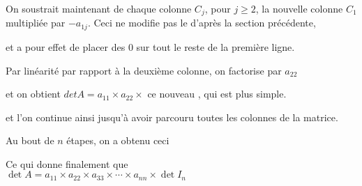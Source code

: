 \change
On soustrait maintenant de chaque colonne $C_j$, pour $j\ge 2$, la nouvelle colonne $C_1$ multipliée 
par $-a_{1j}$.
Ceci ne modifie pas le \deter d'après la section précédente,

\change
et a pour effet de placer des $0$ sur tout le reste de la première ligne.




\diapo
Par linéarité par rapport à la deuxième colonne, on factorise par $a_{22}$

et on obtient $det A = a_{11} \times a_{22} \times$ ce nouveau \deter, qui est plus simple.


\change
et l'on continue ainsi jusqu'à avoir parcouru toutes les colonnes de la matrice.  

Au bout de $n$ étapes, on a obtenu ceci


\change
Ce qui donne finalement que 
\\
 $\det A = a_{11} \times a_{22} \times a_{33}\times \cdots \times {a_{nn}} \times \det I_n$

